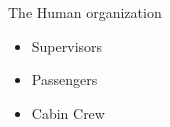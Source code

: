 The Human organization

\begin{itemize}
\item Supervisors
\item Passengers
\item Cabin Crew
\end{itemize}